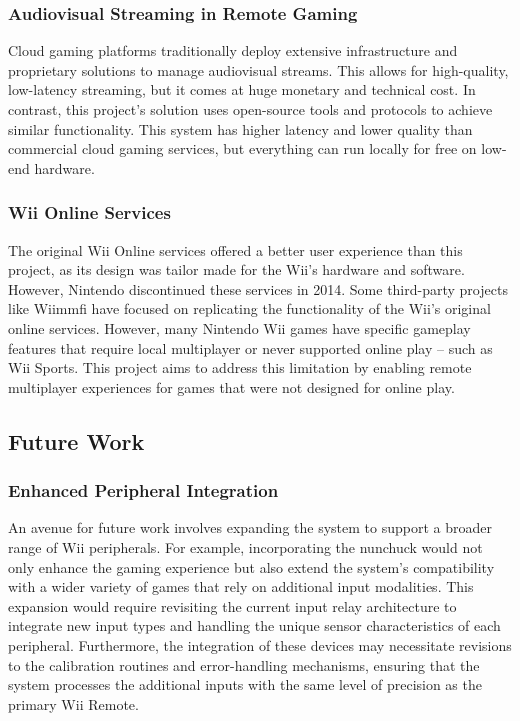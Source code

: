 \subsubsection{Audiovisual Streaming in Remote Gaming}
Cloud gaming platforms traditionally deploy extensive infrastructure and
proprietary solutions to manage audiovisual streams. This allows for
high-quality, low-latency streaming, but it comes at huge monetary and technical
cost\cite{cloud_survey}. In contrast, this project's solution uses open-source tools and
protocols to achieve similar functionality. This system has higher latency and lower quality than
commercial cloud gaming services, but everything can run locally for free on low-end hardware.

\subsubsection{Wii Online Services}
The original Wii Online services offered a better user experience than this
project, as its design was tailor made for the Wii's hardware and software.
However, Nintendo discontinued these services in
2014\cite{nintendoTerminationNintendo}. Some third-party projects like Wiimmfi\cite{wiimmfi}
have focused on replicating the functionality of the Wii’s original online
services. However, many Nintendo Wii games have specific gameplay features that
require local multiplayer or never supported online play -- such as Wii Sports.
This project aims to address this limitation by enabling remote multiplayer
experiences for games that were not designed for online play.

\subsection{Future Work}

\subsubsection{Enhanced Peripheral Integration}
An avenue for future work involves expanding the system to support a broader
range of Wii peripherals. For example, incorporating the nunchuck would not only
enhance the gaming experience but also extend the system's compatibility with a
wider variety of games that rely on additional input modalities. This expansion
would require revisiting the current input relay architecture to integrate new
input types and handling the unique sensor characteristics of each peripheral.
Furthermore, the integration of these devices may necessitate revisions to the
calibration routines and error-handling mechanisms, ensuring that the system
processes the additional inputs with the same level of precision as the primary
Wii Remote.

